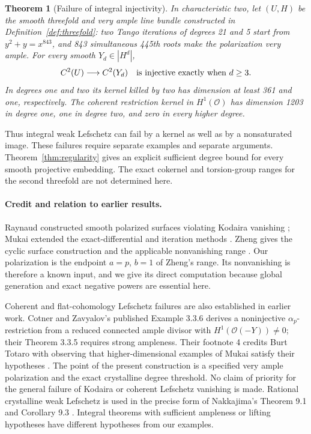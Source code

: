 \documentclass[11pt,a4paper]{article}
\newcommand{\OO}{\mathcal O}
\newtheorem{theorem}{Theorem}[section]
\theoremstyle{definition}\newtheorem{definition}[theorem]{Definition}
\theoremstyle{remark}\newtheorem{remark}[theorem]{Remark}
\numberwithin{equation}{section}
\begin{document}
\begin{theorem}[Failure of integral injectivity]\label{thm:intro-injectivity}
In characteristic two, let $(U,H)$ be the smooth threefold and very ample line bundle constructed in Definition~\ref{def:threefold}: two Tango iterations of degrees 21 and 5 start from $y^2+y=x^{843}$, and 843 simultaneous 445th roots make the polarization very ample. For every smooth $Y_d\in|H^d|$,
\[
 C^2(U)\longrightarrow C^2(Y_d)
 \quad\hbox{is injective exactly when }d\ge3.
\]
In degrees one and two its kernel killed by two has dimension at least 361 and one, respectively. The coherent restriction kernel in $H^1(\OO)$ has dimension 1203 in degree one, one in degree two, and zero in every higher degree.
\end{theorem}

Thus integral weak Lefschetz can fail by a kernel as well as by a nonsaturated image. These failures require separate examples and separate arguments. Theorem~\ref{thm:regularity} gives an explicit sufficient degree bound for every smooth projective embedding. The exact cokernel and torsion-group ranges for the second threefold are not determined here.

\paragraph{Credit and relation to earlier results.}
Raynaud constructed smooth polarized surfaces violating Kodaira vanishing \citep{Raynaud}; Mukai extended the exact-differential and iteration methods \citep[Theorems 1--2, pp.~1--2; Theorem 1.2, p.~3 of the preprint]{Mukai}. Zheng gives the cyclic surface construction and the applicable nonvanishing range \citep[\S2.2, pp.~3--4; Theorem 3.7, p.~8]{Zheng}. Our polarization is the endpoint $a=p$, $b=1$ of Zheng's range. Its nonvanishing is therefore a known input, and we give its direct computation because global generation and exact negative powers are essential here.

Coherent and flat-cohomology Lefschetz failures are also established in earlier work. Cotner and Zavyalov's published Example 3.3.6 derives a noninjective $\alpha_p$-restriction from a reduced connected ample divisor with $H^1(\OO(-Y))\ne0$; their Theorem 3.3.5 requires strong ampleness. Their footnote 4 credits Burt Totaro with observing that higher-dimensional examples of Mukai satisfy their hypotheses \citep[p.~1862]{CotnerZavyalov}. The point of the present construction is a specified very ample polarization and the exact crystalline degree threshold. No claim of priority for the general failure of Kodaira or coherent Lefschetz vanishing is made. Rational crystalline weak Lefschetz is used in the precise form of Nakkajima's Theorem 9.1 and Corollary 9.3 \citep[pp.~63--64]{NakkajimaYobuko}. Integral theorems with sufficient ampleness or lifting hypotheses have different hypotheses from our examples.
\end{document}
